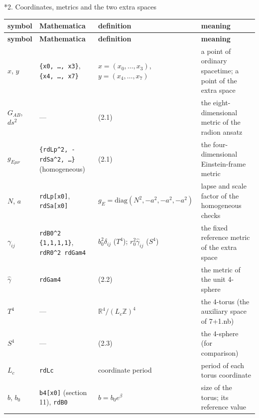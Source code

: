 \documentclass[10pt,a4paper]{article}
\makeatletter
\renewcommand\section{\@startsection{section}{1}{\z@}{-3.5ex \@plus -1ex \@minus -.2ex}{2.3ex \@plus.2ex}{\normalfont\Large\bfseries\raggedright}}
\makeatother
\begin{document}
\section*{2. Coordinates, metrics and the two extra spaces}
{\footnotesize
\begin{longtable}{>{\raggedright\arraybackslash}p{}>{\raggedright\arraybackslash}p{}>{\raggedright\arraybackslash}p{}>{\raggedright\arraybackslash}p{}}
\toprule
\textbf{symbol} & \textbf{Mathematica} & \textbf{definition} & \textbf{meaning} \\
\midrule\endfirsthead
\toprule
\textbf{symbol} & \textbf{Mathematica} & \textbf{definition} & \textbf{meaning} \\
\midrule\endhead
\endfoot
\bottomrule\endlastfoot
$x$, $y$ & \texttt{\{x0, …, x3\}}, \texttt{\{x4, …, x7\}} & $x=(x_0,\dots,x_3)$, $y=(x_4,\dots,x_7)$ & a point of ordinary spacetime; a point of the extra space \\
$G_{AB}$, $ds^2$ & — & (2.1) & the eight-dimensional metric of the radion ansatz \\
$g_{E\mu\nu}$ & \texttt{\{rdLp\textasciicircum{}2, -rdSa\textasciicircum{}2, …\}} (homogeneous) & (2.1) & the four-dimensional Einstein-frame metric \\
$N$, $a$ & \texttt{rdLp[x0]}, \texttt{rdSa[x0]} & $g_E=\mathrm{diag}(N^2,-a^2,-a^2,-a^2)$ & lapse and scale factor of the homogeneous checks \\
$\gamma_{ij}$ & \texttt{rdB0\textasciicircum{}2 \{1,1,1,1\}}, \texttt{rdR0\textasciicircum{}2 rdGam4} & $b_0^2\delta_{ij}$ ($T^4$); $r_0^2\hat\gamma_{ij}$ ($S^4$) & the fixed reference metric of the extra space \\
$\hat\gamma$ & \texttt{rdGam4} & (2.2) & the metric of the unit 4-sphere \\
$T^4$ & — & $\mathbb R^4/(L_c\mathbb Z)^4$ & the 4-torus (the auxiliary space of 7+1.nb) \\
$S^4$ & — & (2.3) & the 4-sphere (for comparison) \\
$L_c$ & \texttt{rdLc} & coordinate period & period of each torus coordinate \\
$b$, $b_0$ & \texttt{b4[x0]} (section 11), \texttt{rdB0} & $b=b_0e^\beta$ & size of the torus; its reference value \\

\end{longtable}}
\end{document}
